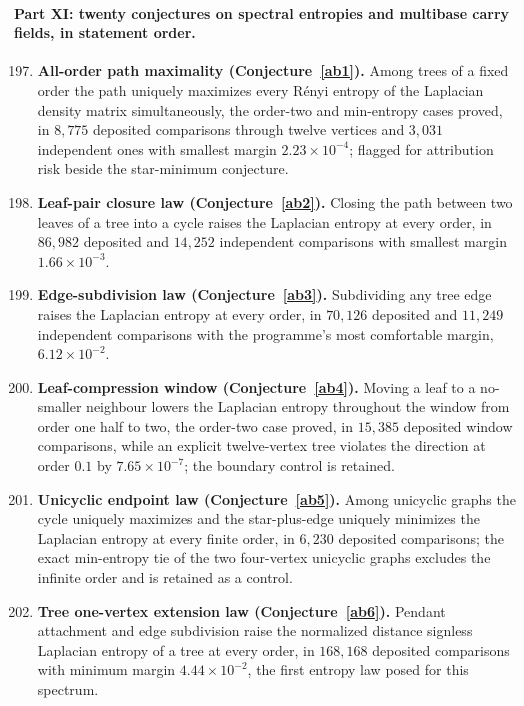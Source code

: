 \documentclass[11pt]{article}
\theoremstyle{definition}
\begin{document}
\paragraph{Part XI: twenty conjectures on spectral entropies and multibase carry fields, in statement order.}
\begin{enumerate}\setcounter{enumi}{196}
\item \textbf{All-order path maximality (Conjecture~\ref{ab1}).}  Among trees of a fixed order the path uniquely maximizes every R\'enyi entropy of the Laplacian density matrix simultaneously, the order-two and min-entropy cases proved, in $8{,}775$ deposited comparisons through twelve vertices and $3{,}031$ independent ones with smallest margin $2.23\times10^{-4}$; flagged for attribution risk beside the star-minimum conjecture.
\item \textbf{Leaf-pair closure law (Conjecture~\ref{ab2}).}  Closing the path between two leaves of a tree into a cycle raises the Laplacian entropy at every order, in $86{,}982$ deposited and $14{,}252$ independent comparisons with smallest margin $1.66\times10^{-3}$.
\item \textbf{Edge-subdivision law (Conjecture~\ref{ab3}).}  Subdividing any tree edge raises the Laplacian entropy at every order, in $70{,}126$ deposited and $11{,}249$ independent comparisons with the programme's most comfortable margin, $6.12\times10^{-2}$.
\item \textbf{Leaf-compression window (Conjecture~\ref{ab4}).}  Moving a leaf to a no-smaller neighbour lowers the Laplacian entropy throughout the window from order one half to two, the order-two case proved, in $15{,}385$ deposited window comparisons, while an explicit twelve-vertex tree violates the direction at order $0.1$ by $7.65\times10^{-7}$; the boundary control is retained.
\item \textbf{Unicyclic endpoint law (Conjecture~\ref{ab5}).}  Among unicyclic graphs the cycle uniquely maximizes and the star-plus-edge uniquely minimizes the Laplacian entropy at every finite order, in $6{,}230$ deposited comparisons; the exact min-entropy tie of the two four-vertex unicyclic graphs excludes the infinite order and is retained as a control.
\item \textbf{Tree one-vertex extension law (Conjecture~\ref{ab6}).}  Pendant attachment and edge subdivision raise the normalized distance signless Laplacian entropy of a tree at every order, in $168{,}168$ deposited comparisons with minimum margin $4.44\times10^{-2}$, the first entropy law posed for this spectrum.

\end{enumerate}
\end{document}
